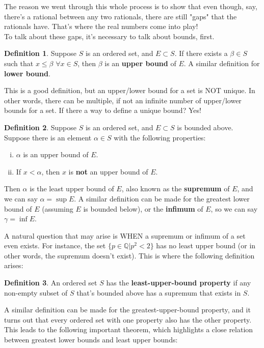 \documentclass{article}
\theoremstyle{definition}
\newtheorem{definition}{Definition}[section]
\begin{document}
\begin{section}
\noindent The reason we went through this whole process is to show that even though, say, there's a rational between any two rationals, there are still "gaps" that the rationals have. That's where the real numbers come into play! \\
To talk about these gaps, it's necessary to talk about bounds, first. 

\begin{definition}
Suppose $S$ is an ordered set, and $E \subset S$. If there exists a $\beta \in S$ such that $x \leq \beta$ $\forall x \in S$, then $\beta$ is an \textbf{upper bound} of $E$. A similar definition for \textbf{lower bound}.
\end{definition}

\noindent This is a good definition, but an upper/lower bound for a set is NOT unique. In other words, there can be multiple, if not an infinite number of upper/lower bounds for a set. If there a way to define a unique bound? Yes!
\begin{definition}
Suppose $S$ is an ordered set, and $E \subset S$ is bounded above. Suppose there is an element $\alpha \in S$ with the following properties:
\begin{enumerate}[(i)]
\item $\alpha$ is an upper bound of $E$.
\item If $x < \alpha$, then $x$ is \textbf{not} an upper bound of $E$.
\end{enumerate}
Then $\alpha$ is the least upper bound of $E$, also known as the \textbf{supremum} of $E$, and we can say $\alpha = \sup E$. \newline
A similar definition can be made for the greatest lower bound of $E$ (assuming $E$ is bounded below), or the \textbf{infimum} of $E$, so we can say $\gamma = \inf E$.
\end{definition} 
\noindent A natural question that may arise is WHEN a supremum or infimum of a set even exists. For instance, the set $\{p \in \mathbb{Q}  \mathrel{} | \mathrel{} p^2 < 2 \} $ has no least upper bound (or in other words, the supremum doesn't exist). This is where the following definition arises:
\begin{definition}
An ordered set $S$ has the \textbf{least-upper-bound property} if any non-empty subset of $S$ that's bounded above has a supremum that exists in $S$.
\end{definition}

\noindent A similar definition can be made for the greatest-upper-bound property, and it turns out that every ordered set with one property also has the other property. This leads to the following important theorem, which highlights a close relation between greatest lower bounds and least upper bounds:


\end{section}
\end{document}
